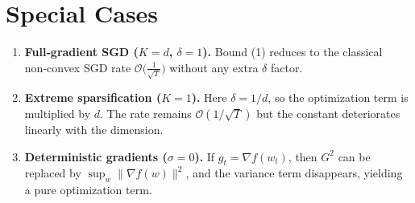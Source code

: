 \documentclass{article}
\begin{document}
\section*{Special Cases}
\begin{enumerate}
\item \textbf{Full‑gradient SGD ($K=d$, $\delta=1$).}  
Bound (1) reduces to the classical non‑convex SGD rate 
$\mathcal{O}\bigl(\frac{1}{\sqrt{T}}\bigr)$ without any extra $\delta$ factor.
\item \textbf{Extreme sparsification ($K=1$).}  
Here $\delta=1/d$, so the optimization term is multiplied by $d$. The rate remains $\mathcal{O}(1/\sqrt{T})$ but the constant deteriorates linearly with the dimension.
\item \textbf{Deterministic gradients ($\sigma=0$).}  
If $g_{t}=\nabla f(w_{t})$, then $G^{2}$ can be replaced by $\sup_{w}\|\nabla f(w)\|^{2}$, and the variance term disappears, yielding a pure optimization term.
\end{enumerate}
\end{document}

